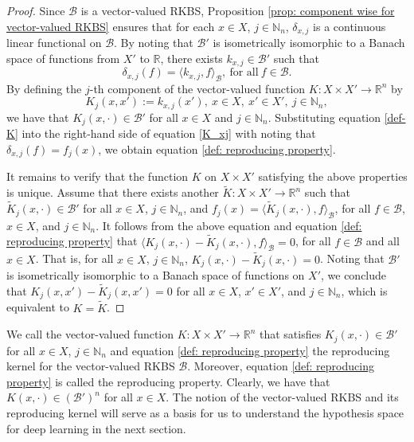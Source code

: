 \documentclass[11pt]{article}
\begin{document}
\begin{proof}
Since $\mathcal{B}$ is a vector-valued RKBS, Proposition \ref{prop: component wise for vector-valued RKBS} ensures that for each $x\in X$, $j\in\mathbb{N}_n$, $\delta_{x,j}$ is a continuous linear functional on $\mathcal{B}$. By noting that $\mathcal{B}'$ is isometrically isomorphic to a Banach space of functions from $X'$ to $\mathbb{R}$, there exists $k_{x,j}\in\mathcal{B}'$ such that \begin{equation}\label{K_xj}
    \delta_{x,j}(f)=\langle k_{x,j},f\rangle_{\mathcal{B}}, \ \mbox{for all}\ f\in\mathcal{B}.
    \end{equation}
By defining the $j$-th component of the vector-valued function $K:X\times X'\to\mathbb{R}^n$ by
\begin{equation}\label{def-K}
   K_j(x,x'):=k_{x,j}(x'),\ x\in X, \ x'\in X',\ j\in\mathbb{N}_n, 
\end{equation}
we have that $K_j(x,\cdot)\in\mathcal{B}'$ for all $x\in X$ and $j\in\mathbb{N}_n$. Substituting equation \eqref{def-K} into the right-hand side of equation \eqref{K_xj} with noting that $\delta_{x,j}(f)=f_j(x)$, we obtain equation \eqref{def: reproducing property}. 

It remains to verify that the function $K$ on $X\times X'$ satisfying the above properties is unique. Assume that there exists another $\widetilde{K}:X\times X'\rightarrow \mathbb{R}^n$ such that $\widetilde{K}_j(x,\cdot)\in \mathcal{B}'$ for all $x\in X$, $j\in\mathbb{N}_n$, and $f_j(x)=\langle \widetilde{K}_j(x,\cdot),f\rangle_{\mathcal{B}}$, for all $f\in\mathcal{B}$, $x\in X$, and $j\in\mathbb{N}_n$. It follows from the above equation and equation \eqref{def: reproducing property} that 
$\langle K_j(x,\cdot)-\widetilde{K}_j(x,\cdot),f\rangle_{\mathcal{B}}=0$, for all $f\in\mathcal{B}$ and all $x\in X$.
That is, for all $x\in X$, $j\in\mathbb{N}_n$, $K_j(x,\cdot)-\widetilde{K}_j(x,\cdot)=0$. Noting that $\mathcal{B}'$ is isometrically isomorphic to a Banach space of functions on $X'$, we conclude that $K_j(x,x')-\widetilde{K}_j(x,x')=0$ for all $x\in X$, $x'\in X'$, and $j\in\mathbb{N}_n$, which is equivalent to $K=\widetilde{K}$.
%
\end{proof}
  
We call the vector-valued function $K:X\times X'\rightarrow\mathbb{R}^n$ that satisfies $K_j(x,\cdot)\in\mathcal{B}'$ for all $x\in X$, $j\in\mathbb{N}_n$ and equation \eqref{def: reproducing property} the reproducing kernel for the vector-valued RKBS $\mathcal{B}$. Moreover, equation \eqref{def: reproducing property} is called the reproducing property. Clearly, we have that $K(x,\cdot)\in(\mathcal{B}')^n$ for all $x\in X$. The notion of the vector-valued RKBS and its reproducing kernel will serve as a basis for us to understand the hypothesis space for deep learning in the next section.
\end{document}
